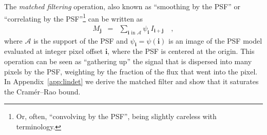 \documentclass[11pt,letterpaper,linenumbers]{aastex63}
\newcommand{\appref}[1]{\mbox{Appendix~\ref{#1}}}
\newcommand{\psf}{\psi}
\newcommand{\psfat}[1]{\psf_{#1}}
\renewcommand{\vec}[1]{\boldsymbol{#1}}
\newcommand{\ivec}{\vec{i}}
\newcommand{\jvec}{\vec{j}}
\newcommand{\iina}{\ivec \,\, \mathrm{in} \,\, \mathcal{A}}
\begin{document}
The \emph{matched filtering} operation, also known as ``smoothing by
the PSF'' or ``correlating by the PSF''\footnote{
  Or, often, ``convolving by the PSF'', being slightly careless with terminology.}
can be written as
\begin{eqnarray}
  M_{\jvec} &=& \sum_{\iina} \psfat{\ivec} \, I_{\ivec + \jvec}
  \nonumber \quad ,
\end{eqnarray}
where $\mathcal{A}$ is the support of the PSF and $\psfat{\ivec} =
\psf(\ivec)$ is an image of the PSF model evaluated at integer pixel
offset $\ivec$, where the PSF is centered at the origin.  This
operation can be seen as ``gathering up'' the signal that is dispersed
into many pixels by the PSF, weighting by the fraction of the flux
that went into the pixel.  In \appref{app:lindet} we derive the
matched filter and show that it saturates the Cram\'er--Rao bound.




\end{document}
